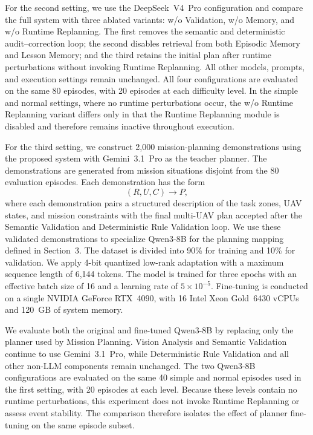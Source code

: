For the second setting, we use the DeepSeek~V4~Pro configuration and compare the
full system with three ablated variants: w/o Validation, w/o Memory, and w/o
Runtime Replanning. The first removes the semantic and deterministic
audit--correction loop; the second disables retrieval from both Episodic Memory
and Lesson Memory; and the third retains the initial plan after runtime
perturbations without invoking Runtime Replanning. All other models, prompts,
and execution settings remain unchanged. All four configurations are evaluated
on the same 80 episodes, with 20 episodes at each difficulty level. In the
simple and normal settings, where no runtime perturbations occur, the w/o
Runtime Replanning variant differs only in that the Runtime Replanning module
is disabled and therefore remains inactive throughout execution.

For the third setting, we construct 2,000 mission-planning demonstrations
using the proposed system with Gemini~3.1~Pro as the teacher planner. The
demonstrations are generated from mission situations disjoint from the 80
evaluation episodes. Each demonstration has the form
\[
(R,U,C) \rightarrow P,
\]
where each demonstration pairs a structured description of the task zones, UAV
states, and mission constraints with the final multi-UAV plan accepted after the
Semantic Validation and Deterministic Rule Validation loop. We use these
validated demonstrations to specialize Qwen3-8B for the planning mapping
defined in Section~3. The dataset is divided into 90\% for training and 10\%
for validation. We apply 4-bit quantized low-rank adaptation with a maximum
sequence length of 6,144 tokens. The model is trained for three epochs with an
effective batch size of 16 and a learning rate of $5\times10^{-5}$. Fine-tuning
is conducted on a single NVIDIA GeForce RTX~4090, with 16 Intel Xeon Gold~6430
vCPUs and 120~GB of system memory.

We evaluate both the original and fine-tuned Qwen3-8B by replacing only the
planner used by Mission Planning. Vision Analysis and Semantic Validation
continue to use Gemini~3.1~Pro, while Deterministic Rule Validation and all
other non-LLM components remain unchanged. The two Qwen3-8B configurations are
evaluated on the same 40 simple and normal episodes used in the first setting,
with 20 episodes at each level. Because these levels contain no runtime perturbations,
this experiment does not invoke Runtime Replanning or assess event stability.
The comparison therefore isolates the effect of planner fine-tuning on the
same episode subset.

